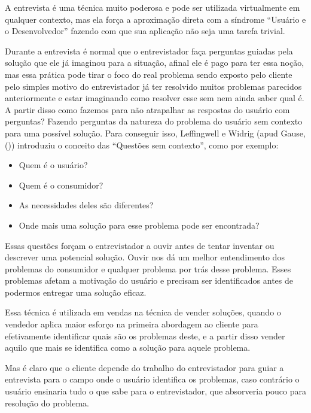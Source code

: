       A entrevista é uma técnica muito poderosa e pode ser utilizada virtualmente em qualquer contexto, 
      mas ela força a aproximação direta com a síndrome “Usuário e o Desenvolvedor” 
      fazendo com que sua aplicação não seja uma tarefa trivial.

      Durante a entrevista é normal que o entrevistador faça perguntas guiadas pela solução que ele já imaginou para a situação, 
      afinal ele é pago para ter essa noção, 
      mas essa prática pode tirar o foco do real problema sendo exposto pelo cliente 
      pelo simples motivo do entrevistador já ter resolvido muitos problemas parecidos 
      anteriormente e estar imaginando como resolver esse sem nem ainda saber qual é. 
      A partir disso como fazemos para não atrapalhar as respostas do usuário com perguntas? 
      Fazendo perguntas da natureza do problema do usuário sem contexto para uma possível solução. 
      Para conseguir isso,  Leffingwell e Widrig (apud Gause, (\citeyear{gause89})) introduziu o conceito das 
      “Questões sem contexto”, como por exemplo:
      
      \begin{itemize}
       \item Quem é o usuário?
       \item Quem é o consumidor?
       \item As necessidades deles são diferentes?
       \item Onde mais uma solução para esse problema pode ser encontrada?
      \end{itemize}
      
      Essas questões forçam o entrevistador a ouvir antes de tentar inventar ou descrever uma potencial solução. 
      Ouvir nos dá um melhor entendimento dos problemas do consumidor e qualquer problema por trás desse problema. 
      Esses problemas afetam a motivação do usuário e precisam ser identificados antes de podermos entregar uma solução eficaz.
    
      Essa técnica é utilizada em vendas na técnica de vender soluções, 
      quando o vendedor aplica maior esforço na primeira abordagem ao cliente para efetivamente identificar quais são os problemas deste, 
      e a partir disso vender aquilo que mais se identifica como a solução para aquele problema.
    
      Mas é claro que o cliente depende do trabalho do entrevistador para guiar a entrevista 
      para o campo onde o usuário identifica os problemas, caso contrário o usuário ensinaria 
      tudo o que sabe para o entrevistador, que absorveria pouco para resolução do problema.
      
